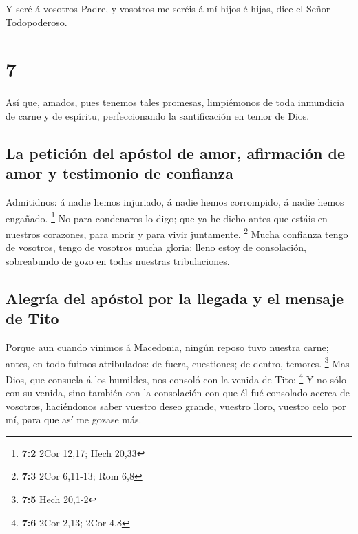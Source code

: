  Y seré á vosotros Padre, y vosotros me seréis á mí hijos é
hijas, dice el Señor Todopoderoso.

\hypertarget{section-6}{%
\section{7}\label{section-6}}

 Así que, amados, pues tenemos tales promesas, limpiémonos
de toda inmundicia de carne y de espíritu, perfeccionando la
santificación en temor de Dios.

\hypertarget{la-peticiuxf3n-del-apuxf3stol-de-amor-afirmaciuxf3n-de-amor-y-testimonio-de-confianza}{%
\subsection{La petición del apóstol de amor, afirmación de amor y
testimonio de
confianza}\label{la-peticiuxf3n-del-apuxf3stol-de-amor-afirmaciuxf3n-de-amor-y-testimonio-de-confianza}}

 Admitidnos: á nadie hemos injuriado, á nadie hemos
corrompido, á nadie hemos engañado. \footnote{\textbf{7:2} 2Cor 12,17;
  Hech 20,33}  No para condenaros lo digo; que ya he dicho
antes que estáis en nuestros corazones, para morir y para vivir
juntamente. \footnote{\textbf{7:3} 2Cor 6,11-13; Rom 6,8} 
Mucha confianza tengo de vosotros, tengo de vosotros mucha gloria; lleno
estoy de consolación, sobreabundo de gozo en todas nuestras
tribulaciones.

\hypertarget{alegruxeda-del-apuxf3stol-por-la-llegada-y-el-mensaje-de-tito}{%
\subsection{Alegría del apóstol por la llegada y el mensaje de
Tito}\label{alegruxeda-del-apuxf3stol-por-la-llegada-y-el-mensaje-de-tito}}

 Porque aun cuando vinimos á Macedonia, ningún reposo tuvo
nuestra carne; antes, en todo fuimos atribulados: de fuera, cuestiones;
de dentro, temores. \footnote{\textbf{7:5} Hech 20,1-2}  Mas
Dios, que consuela á los humildes, nos consoló con la venida de Tito:
\footnote{\textbf{7:6} 2Cor 2,13; 2Cor 4,8}  Y no sólo con
su venida, sino también con la consolación con que él fué consolado
acerca de vosotros, haciéndonos saber vuestro deseo grande, vuestro
lloro, vuestro celo por mí, para que así me gozase más.

